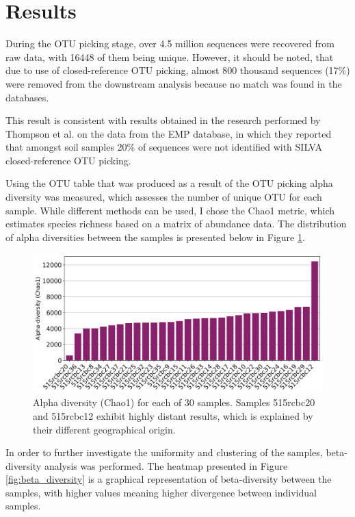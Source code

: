 \documentclass[12pt,twocolumn]{article}
\begin{document}
\section{Results} 
During the OTU picking stage, over 4.5 million sequences were recovered from raw data, with 16448 of them being unique. However, it should be noted, that due to use of closed-reference OTU picking, almost 800 thousand sequences (17\%) were removed from the downstream analysis because no match was found in the databases. 
\par
This result is consistent with results obtained in the research performed by Thompson et al.\cite{Thompson2017} on the data from the EMP database, in which they reported that amongst soil samples 20\% of sequences were not identified with SILVA closed-reference OTU picking.
\par
Using the OTU table that was produced as a result of the OTU picking alpha diversity was measured, which assesses the number of unique OTU for each sample. While different methods can be used, I chose the Chao1 metric, which estimates species richness based on a matrix of abundance data. 
The distribution of alpha diversities between the samples is presented below in Figure \ref{fig:alpha_diversity}.
\begin{figure}[ht!]
	\includegraphics[width=\linewidth]{chao1_alpha.png}
	\caption{Alpha diversity (Chao1) for each of 30 samples. Samples 515rcbc20 and 515rcbc12 exhibit highly distant results, which is explained by their different geographical origin.}
	\label{fig:alpha_diversity}
\end{figure}
\par
In order to further investigate the uniformity and clustering of the samples, beta-diversity analysis was performed. The heatmap presented in Figure \ref{fig:beta_diversity} is a graphical representation of beta-diversity between the samples, with higher values meaning higher divergence between individual samples.
\end{document}
